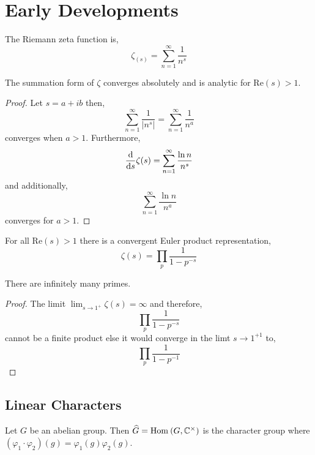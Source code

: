 \documentclass[12pt]{article}
\begin{document}
\section{Early Developments}

\renewcommand{\C}{\mathbb{C}}
\newcommand{\wh}[1]{\widehat{#1}}
\renewcommand{\Re}[1]{\mathrm{Re}\left(#1\right)}

\begin{defn}
The Riemann zeta function is,
\[ \zeta_(s) = \sum_{n = 1}^\infty \frac{1}{n^s} \]
\end{defn}

\begin{prop}
The summation form of $\zeta$ converges absolutely and is analytic for $\Re{s} > 1$. 
\end{prop}

\begin{proof}
Let $s = a + i b$ then,
\[ \sum_{n = 1}^\infty \frac{1}{|n^s|} = \sum_{n = 1}^\infty \frac{1}{n^a} \]
converges when $a > 1$. Furthermore, 
\[ \frac{\mathrm{d}{}}{\mathrm{d}{s}} \zeta(s) = \sum_{n = 1}^\infty \frac{\ln{n}}{n^s} \] 
and additionally,
\[ \sum_{n = 1}^\infty \frac{\ln{n}}{n^a} \] 
converges for $a > 1$.
\end{proof}

\begin{prop}
For all $\Re{s} > 1$ there is a convergent Euler product representation,
\[ \zeta(s) = \prod_{p} \frac{1}{1 - p^{-s}} \]
\end{prop}


\begin{cor}
There are infinitely many primes.
\end{cor}

\begin{proof}
The limit $\lim_{s \to 1^{+}} \zeta(s) = \infty$ and therefore,
\[ \prod_{p} \frac{1}{1 - p^{-s}} \]
cannot be a finite product else it would converge in the limt $s \to 1^{+1}$ to,
\[ \prod_{p} \frac{1}{1 - p^{-1}} \]
\end{proof}

\subsection{Linear Characters}

\begin{defn}
Let $G$ be an abelian group. Then $\wh{G} = \Hom{}{G}{\C^\times}$ is the character group where $(\varphi_1 \cdot \varphi_2)(g) = \varphi_1(g)\varphi_2(g)$.
\end{defn}
\end{document}
